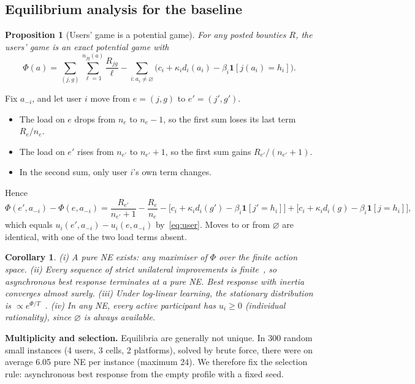 \documentclass[12pt,draftcls,onecolumn]{IEEEtran}
\newtheorem{proposition}{Proposition}
\newtheorem{corollary}{Corollary}
\begin{document}
\subsection{Equilibrium analysis for the baseline}\label{sec:eq}
\begin{proposition}[Users' game is a potential game]\label{prop:potential}
For any posted bounties $R$, the users' game is an exact potential game with
\[\Phi(a)=\sum_{(j,g)}\sum_{\ell=1}^{n_{jg}(a)}\frac{R_{jg}}{\ell}-\sum_{i:a_i\neq\varnothing}\Big(c_i+\kappa_id_i(a_i)-\beta_i\mathbf 1[j(a_i)=h_i]\Big).\]
\end{proposition}
\begin{IEEEproof}
Fix $a_{-i}$, and let user $i$ move from $e=(j,g)$ to $e'=(j',g')$.
\begin{itemize}
\item The load on $e$ drops from $n_e$ to $n_e-1$, so the first sum loses its last term $R_e/n_e$.
\item The load on $e'$ rises from $n_{e'}$ to $n_{e'}+1$, so the first sum gains $R_{e'}/(n_{e'}+1)$.
\item In the second sum, only user $i$'s own term changes.
\end{itemize}
Hence
\[\Phi(e',a_{-i})-\Phi(e,a_{-i})=\frac{R_{e'}}{n_{e'}+1}-\frac{R_e}{n_e}-\big[c_i+\kappa_id_i(g')-\beta_i\mathbf 1[j'=h_i]\big]+\big[c_i+\kappa_id_i(g)-\beta_i\mathbf 1[j=h_i]\big],\]
which equals $u_i(e',a_{-i})-u_i(e,a_{-i})$ by~\eqref{eq:user}. Moves to or from $\varnothing$ are identical, with one of the two load terms absent.
\end{IEEEproof}

\begin{corollary}\label{cor:ne}
(i) A pure NE exists: any maximiser of $\Phi$ over the finite action space.
(ii) Every sequence of strict unilateral improvements is finite~\cite{monderer1996potential}, so asynchronous best response terminates at a pure NE. Best response with inertia converges almost surely.
(iii) Under log-linear learning, the stationary distribution is $\propto e^{\Phi/T}$~\cite{blume1993}.
(iv) In any NE, every active participant has $u_i\ge0$ (individual rationality), since $\varnothing$ is always available.
\end{corollary}

\textbf{Multiplicity and selection.} Equilibria are generally not unique. In 300 random small instances (4 users, 3 cells, 2 platforms), solved by brute force, there were on average 6.05 pure NE per instance (maximum 24). We therefore fix the selection rule: asynchronous best response from the empty profile with a fixed seed.
\end{document}
